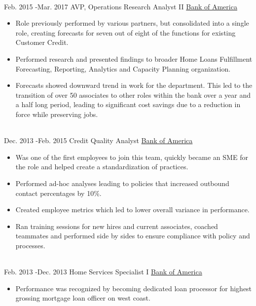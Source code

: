 \documentclass[letterpaper]{twentysecondcv} %
\begin{document}
\begin{twenty}
{\begin{itemize}
        \end{itemize}}
        \\
	\twentyitem
    	{Feb. 2015 -}{Mar. 2017}
        {AVP, Operations Research Analyst II}
        {\href{https://www.bankofamerica.com/}{Bank of America}}
        {}
        {
        {\begin{itemize}
			\item Role previously performed by various partners, but consolidated into a single role, creating forecasts for seven out of eight of the functions for existing Customer Credit.
			\item Performed research and presented findings to broader Home Loans Fulfillment Forecasting, Reporting, Analytics and Capacity Planning organization.
			\item Forecasts showed downward trend in work for the department. This led to the transition of over 50 associates to other roles within the bank over a year and a half long period, leading to significant cost savings due to a reduction in force while preserving jobs.
    	\end{itemize}}
        }
    \\   
    \twentyitem
   		{Dec. 2013 -}{Feb. 2015}
        {Credit Quality Analyst}
        {\href{https://www.bankofamerica.com/}{Bank of America}}
        {}
        {
        {\begin{itemize}
			\item Was one of the first employees to join this team, quickly became an SME for the role and helped create a standardization of practices.
			\item Performed ad-hoc analyses leading to policies that increased outbound contact percentages by 10\%.
			\item Created employee metrics which led to lower overall variance in performance.
			\item Ran training sessions for new hires and current associates, coached teammates and performed side by sides to ensure compliance with policy and processes. 
 	   \end{itemize}}
        }
     \\
     \twentyitem
   		{Feb. 2013 -}{Dec. 2013}
        {Home Services Specialist I}
        {\href{https://www.bankofamerica.com/}{Bank of America}}
        {}
        {
        \begin{itemize}
        	\item Performance was recognized by becoming dedicated loan processor for highest grossing mortgage loan officer on west coast.

\end{itemize}}
\end{twenty}
\end{document}
